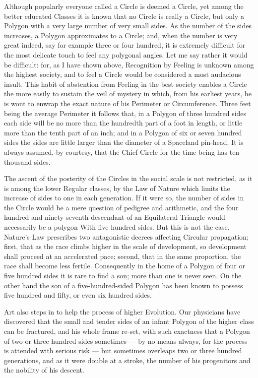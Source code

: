 \documentclass[12pt, a4paper, oneside]{memoir}
\begin{document}
Although popularly everyone called a Circle is deemed a Circle, yet among the
better educated Classes it is known that no Circle is really a Circle, but
only a Polygon with a very large number of very small sides. As the number of
the sides increases, a Polygon approximates to a Circle; and, when the number
is very great indeed, say for example three or four hundred, it is extremely
difficult for the most delicate touch to feel any polygonal angles. Let me say
rather it would be difficult: for, as I have shown above, Recognition by
Feeling is unknown among the highest society, and to feel a Circle would be
considered a most audacious insult. This habit of abstention from Feeling in
the best society enables a Circle the more easily to sustain the veil of
mystery in which, from his earliest years, he is wont to enwrap the exact
nature of his Perimeter or Circumference. Three feet being the average
Perimeter it follows that, in a Polygon of three hundred sides each side will
be no more than the hundredth part of a foot in length, or little more than
the tenth part of an inch; and in a Polygon of six or seven hundred sides the
sides are little larger than the diameter of a Spaceland pin-head. It is
always assumed, by courtesy, that the Chief Circle for the time being has ten
thousand sides.

The ascent of the posterity of the Circles in the social scale is not
restricted, as it is among the lower Regular classes, by the Law of Nature
which limits the increase of sides to one in each generation. If it were so,
the number of sides in the Circle would be a mere question of pedigree and
arithmetic, and the four hundred and ninety-seventh descendant of an
Equilateral Triangle would necessarily be a polygon With five hundred sides.
But this is not the case. Nature's Law prescribes two antagonistic decrees
affecting Circular propagation; first, that as the race climbs higher in the
scale of development, so development shall proceed at an accelerated pace;
second, that in the same proportion, the race shall become less fertile.
Consequently in the home of a Polygon of four or five hundred sides it is rare
to find a son; more than one is never seen. On the other hand the son of a
five-hundred-sided Polygon has been known to possess five hundred and fifty,
or even six hundred sides.

Art also steps in to help the process of higher Evolution. Our physicians have
discovered that the small and tender sides of an infant Polygon of the higher
class can be fractured, and his whole frame re-set, with such exactness that a
Polygon of two or three hundred sides sometimes --- by no means always, for the
process is attended with serious risk --- but sometimes overleaps two or three
hundred generations, and as it were double at a stroke, the number of his
progenitors and the nobility of his descent.
\end{document}
